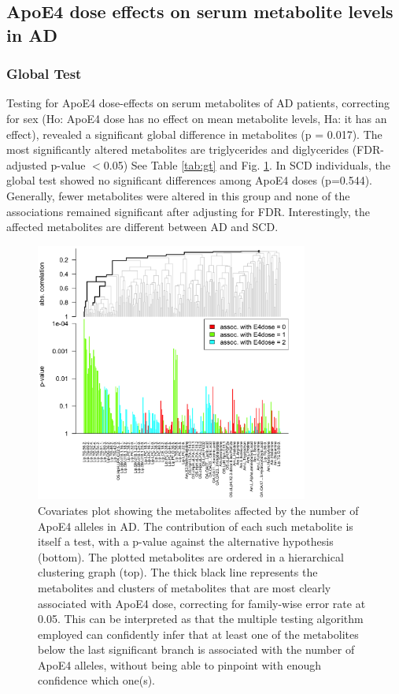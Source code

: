 \documentclass{amsart}
\begin{document}
\newpage \subsection{ApoE4 dose effects on serum metabolite levels in AD}
\subsubsection{Global Test}
Testing for ApoE4 dose-effects on serum metabolites of AD patients, correcting for sex (Ho: ApoE4 dose has no effect on mean metabolite levels, Ha: it has an effect), revealed a significant global difference in metabolites (p = 0.017). The most significantly altered metabolites are triglycerides and diglycerides (FDR-adjusted p-value $<$0.05) See Table \ref{tab:gt} and Fig. \ref{plot:gt}. In SCD individuals, the global test showed no significant differences among ApoE4 doses (p=0.544). Generally, fewer metabolites were altered in this group and none of the associations remained significant after adjusting for FDR. Interestingly, the affected metabolites are different between AD and SCD.
\begin{figure}[H]
  \includegraphics[width=0.8\textwidth]{figures/gt2.png}
    \caption{Covariates plot showing the metabolites affected by the number of ApoE4 alleles in AD. The contribution of each such metabolite is itself a test, with a p-value against the alternative hypothesis (bottom). The plotted metabolites are ordered in a hierarchical clustering graph (top). The thick black line represents the metabolites and clusters of metabolites that are most clearly associated with ApoE4 dose, correcting for family-wise error rate at 0.05. This can be interpreted as that the multiple testing algorithm employed can confidently infer that at least one of the metabolites below the last significant branch is associated with the number of ApoE4 alleles, without being able to pinpoint with enough confidence which one(s).}
  \label{plot:gt}
\end{figure}
\end{document}

